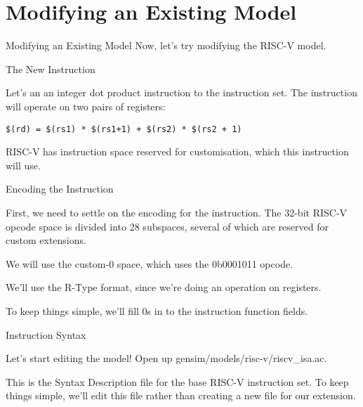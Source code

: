 \section{Modifying an Existing Model}

\begin{frame}{Modifying an Existing Model}
Now, let's try modifying the RISC-V model.
\end{frame}

\begin{frame}[fragile]{The New Instruction}

Let's an an integer dot product instruction to the instruction set. 
The instruction will operate on two pairs of registers:

\begin{lstlisting}
$(rd) = $(rs1) * $(rs1+1) + $(rs2) * $(rs2 + 1)
\end{lstlisting}

RISC-V has instruction space reserved for customisation, which this 
instruction will use.

\end{frame}

\begin{frame}{Encoding the Instruction}






First, we need to settle on the encoding for the instruction. The 32-bit
RISC-V opcode space is divided into 28 subspaces, several of
which are reserved for custom extensions. 

\bigskip

We will use the custom-0 space, which uses the 0b0001011 opcode.

\smallskip

We'll use the R-Type format, since we're doing an operation on registers.

\smallskip

To keep things simple, we'll fill 0s in to the instruction function
fields.

\end{frame}

\begin{frame}{Instruction Syntax}

Let's start editing the model! Open up {\ttfamily gensim/models/risc-v/riscv\_isa.ac}.

This is the Syntax Description file for the base RISC-V instruction set.
To keep things simple, we'll edit this file rather than creating a new 
file for our extension. 

\end{frame}

